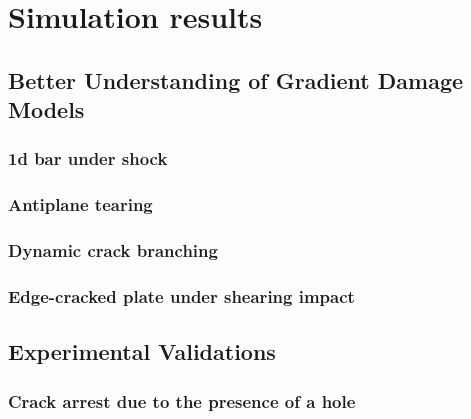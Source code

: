 \chapter{Simulation results}
\minitoc

\section{Better Understanding of Gradient Damage Models}

\subsection{1d bar under shock}

\subsection{Antiplane tearing}

\subsection{Dynamic crack branching}

\subsection{Edge-cracked plate under shearing impact}

\section{Experimental Validations}

\subsection{Crack arrest due to the presence of a hole}

